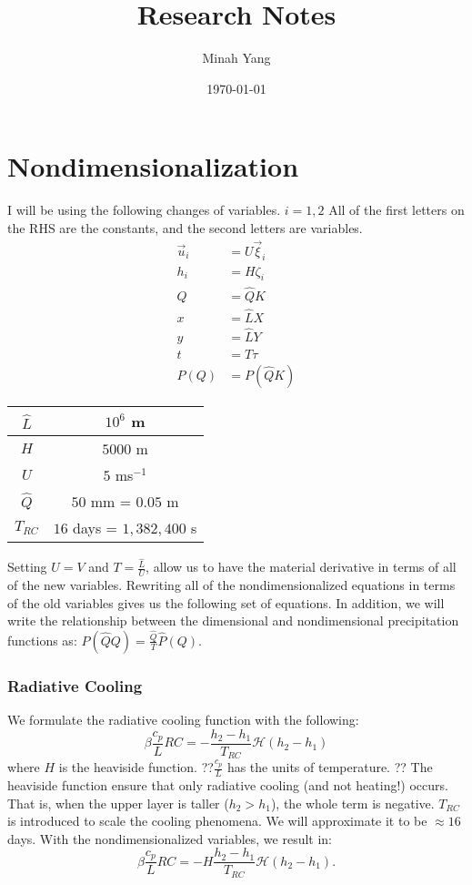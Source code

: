 \documentclass[10pt]{article}
\title{Research Notes}
\author{Minah Yang}
\date{\today}
\newcommand{\HH}{\mathcal{H}}
\begin{document}
\maketitle
\section*{Nondimensionalization}
I will be using the following changes of variables. $i=1,2$ All of the first letters on the RHS are the constants, and the second letters are variables. 
\begin{align}
\vec{u}_i &= U \vec{\xi}_i\\
h_i &= H \zeta_i\\
Q &= \hat{Q} K \\
x &= \hat{L}X \\
y &= \hat{L}Y \\
t &= T \tau \\
P(Q) &= P (\hat{Q}K)
\end{align}
 
 \begin{center}
 	\begin{tabular}{ |c|c| } 
 		\hline
 		$\hat{L}$ & $10^6$ m \\ \hline
 		$H$ & $5000$ m \\ \hline
 		$U$ & $5$ ms$^{-1}$ \\ \hline
 		$\hat{Q}$ & $50$ mm = $0.05$ m \\ \hline
 		$T_{RC}$ & $16$ days = $1,382,400$ s \\ \hline
 	\end{tabular}
 \end{center}

Setting $U=V$ and $T=\frac{\hat{L}}{U}$, allow us to have the material derivative in terms of all of the new variables. Rewriting all of the nondimensionalized equations in terms of the old variables gives us the following set of equations. In addition, we will write the relationship between the dimensional and nondimensional precipitation functions as: $P(\hat{Q}Q) = \frac{\hat{Q}}{T}\hat{P}(Q)$. 

\subsubsection{Radiative Cooling}

We formulate the radiative cooling function with the following:
\begin{equation}
\beta \frac{c_p}{L} RC = -\frac{h_2-h_1}{T_{RC}}\HH(h_2-h_1)
\end{equation}
where $H$ is the heaviside function. ??$\frac{c_p}{L}$ has the units of temperature. ?? The heaviside function ensure that only radiative cooling (and not heating!) occurs. That is, when the upper layer  is taller ($h_2 > h_1$), the whole term is negative. $T_{RC}$ is introduced to scale the cooling phenomena. We will approximate it to be $\approx 16$ days. With the nondimensionalized variables, we result in:
\begin{equation}
\beta \frac{c_p}{L} RC = -H\frac{h_2-h_1}{T_{RC}}\HH(h_2-h_1).
\end{equation}
\end{document}
